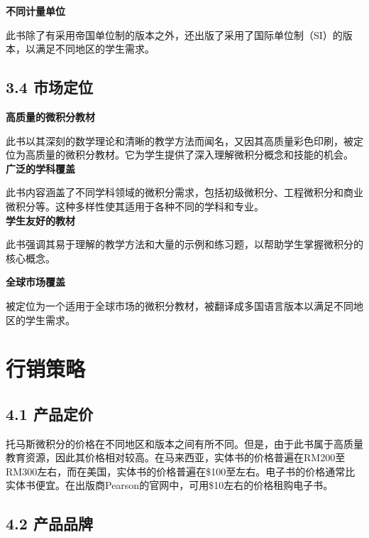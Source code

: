 \documentclass{report}
\begin{document}
\noindent\textbf{不同计量单位}

\noindent 此书除了有采用帝国单位制的版本之外，还出版了采用了国际单位制（SI）的版本，以满足不同地区的学生需求。

\subsection*{3.4 市场定位}

\noindent\textbf{高质量的微积分教材}

\noindent 此书以其深刻的数学理论和清晰的教学方法而闻名，又因其高质量彩色印刷，被定位为高质量的微积分教材。它为学生提供了深入理解微积分概念和技能的机会。
~\\

\noindent\textbf{广泛的学科覆盖}

\noindent 此书内容涵盖了不同学科领域的微积分需求，包括初级微积分、工程微积分和商业微积分等。这种多样性使其适用于各种不同的学科和专业。
~\\

\noindent\textbf{学生友好的教材}

\noindent 此书强调其易于理解的教学方法和大量的示例和练习题，以帮助学生掌握微积分的核心概念。

\newpage
\noindent\textbf{全球市场覆盖}

\noindent 被定位为一个适用于全球市场的微积分教材，被翻译成多国语言版本以满足不同地区的学生需求。

\section*{行销策略}

\subsection*{4.1 产品定价}

托马斯微积分的价格在不同地区和版本之间有所不同。但是，由于此书属于高质量教育资源，因此其价格相对较高。在马来西亚，实体书的价格普遍在RM200至RM300左右，而在美国，实体书的价格普遍在\$100至左右。电子书的价格通常比实体书便宜。在出版商Pearson的官网中，可用\$10左右的价格租购电子书。

\subsection*{4.2 产品品牌}
\end{document}
